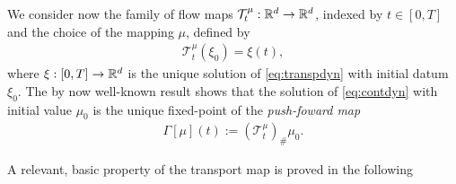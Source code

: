 We consider now the family of flow maps $\mathcal{T}^{\mu}_t:\mathbb{R}^d \rightarrow\mathbb{R}^d$, indexed by $t \in [0,T]$ and the choice of the mapping $\mu$, defined by
\begin{align*}
\mathcal{T}^{\mu}_t(\xi_0) = \xi(t),
\end{align*}
where $\xi:[0,T]\rightarrow\mathbb{R}^d$ is the unique solution of \eqref{eq:transpdyn} with initial datum $\xi_0$. The by now well-known result \cite[Theorem 3.10]{CanCarRos10} shows that the solution of \eqref{eq:contdyn} with initial value $\mu_0$ is the unique fixed-point of the \textit{push-foward map}
\begin{align}\label{eq:fixedpoint}
\Gamma[\mu](t) := (\mathcal{T}^{\mu}_t)_{\#}\mu_0.
\end{align}

A relevant, basic property of the transport map is proved in the following


